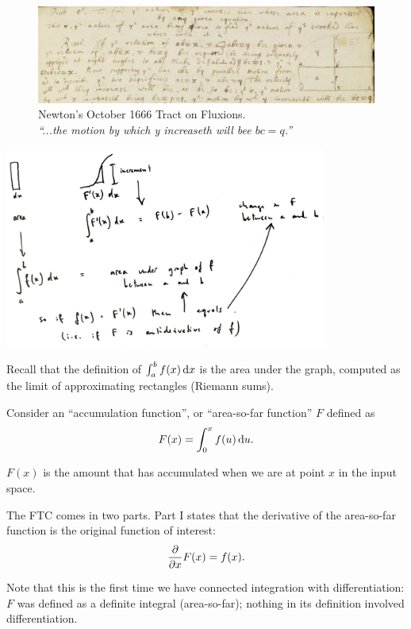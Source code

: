 \begin{figure}[h]
  \centering
  \includegraphics[width=500pt]{img/newton-october-1666-tract-ftc.png}
  \captionsetup{labelformat=empty,justification=centering}
  \caption[xxx]{Newton's October 1666 Tract on Fluxions.\\
    \emph{``...the motion by which y increaseth will bee $bc = q$.''}}
\end{figure}

\includegraphics[width=300pt]{img/ftc.png}

Recall that the definition of $\int_a^b f(x) \dx$ is the area under the graph,
computed as the limit of approximating rectangles (Riemann sums).

Consider an ``accumulation function'', or ``area-so-far function'' $F$ defined
as
\begin{align*}
  F(x) = \int_0^x f(u) \d u.
\end{align*}

$F(x)$ is the amount that has accumulated when we are at point $x$ in the
input space.

The FTC comes in two parts. Part I states that the derivative of the
area-so-far function is the original function of interest:
\begin{align*}
  \frac{\partial}{\partial x} F(x) = f(x).
\end{align*}

Note that this is the first time we have connected integration with
differentiation: $F$ was defined as a definite integral (area-so-far); nothing
in its definition involved differentiation.

